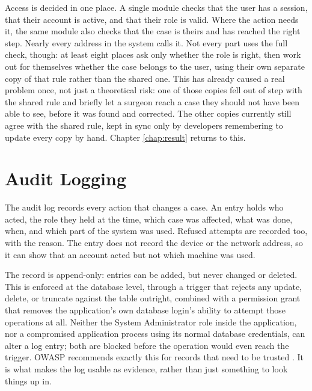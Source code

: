 Access is decided in one place. A single module checks that the user has a session, that their account is active, and that their role is valid. Where the action needs it, the same module also checks that the case is theirs and has reached the right step. Nearly every address in the system calls it. Not every part uses the full check, though: at least eight places ask only whether the role is right, then work out for themselves whether the case belongs to the user, using their own separate copy of that rule rather than the shared one. This has already caused a real problem once, not just a theoretical risk: one of those copies fell out of step with the shared rule and briefly let a surgeon reach a case they should not have been able to see, before it was found and corrected. The other copies currently still agree with the shared rule, kept in sync only by developers remembering to update every copy by hand. Chapter \ref{chap:result} returns to this.

\section{Audit Logging}
\label{sec:impl-audit}

The audit log records every action that changes a case. An entry holds who acted, the role they held at the time, which case was affected, what was done, when, and which part of the system was used. Refused attempts are recorded too, with the reason. The entry does not record the device or the network address, so it can show that an account acted but not which machine was used.

The record is append-only: entries can be added, but never changed or deleted. This is enforced at the database level, through a trigger that rejects any update, delete, or truncate against the table outright, combined with a permission grant that removes the application's own database login's ability to attempt those operations at all. Neither the System Administrator role inside the application, nor a compromised application process using its normal database credentials, can alter a log entry; both are blocked before the operation would even reach the trigger. OWASP recommends exactly this for records that need to be trusted \cite{owasp2021}. It is what makes the log usable as evidence, rather than just something to look things up in.

